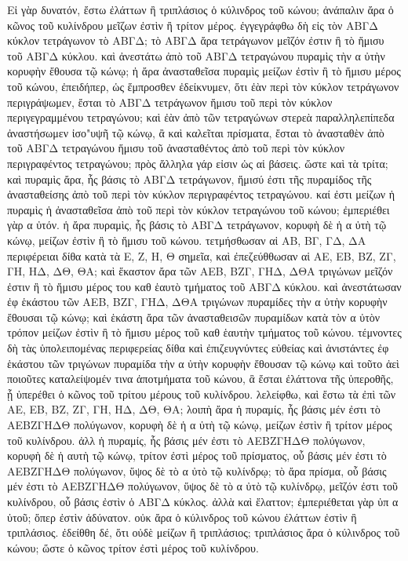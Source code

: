 \begin{Parallel}{}{}
{{\greekfont Εἰ γὰρ δυνατόν, ἔστω ἐλάττων ἢ τριπλάσιος ὁ κύλινδρος τοῦ κώνου;
  ἀνάπαλιν ἄρα ὁ κῶνος
τοῦ κυλίνδρου μεῖζων ἐστὶν ἢ τρίτον μέρος. ἐγγεγράφθω δὴ εἰς τὸν ΑΒΓΔ κύκλον τετράγωνον τὸ
ΑΒΓΔ; τὸ ΑΒΓΔ ἄρα τετράγωνον μεῖζόν ἐστιν ἢ τὸ ἥμισυ τοῦ ΑΒΓΔ κύκλου. καὶ ἀνεστάτω
ἀπὸ τοῦ ΑΒΓΔ τετραγώνου πυραμὶς τὴν α ὐτὴν κορυφὴν ἔθουσα τῷ κώνῳ; ἠ ἄρα ἀνασταθεῖσα
πυραμὶς μείζων ἐστὶν ἢ τὸ ἥμισυ μέρος τοῦ κώνου, ἐπειδήπερ, ὡς ἕμπροσθεν ἐδείκνυμεν,
ὅτι ἐὰν περὶ τὸν κύκλον τετράγωνον περιγράψωμεν, ἔσται τὸ ΑΒΓΔ τετράγωνον ἥμισυ τοῦ
περὶ τὸν κύκλον περιγεγραμμένου τετραγώνου; καὶ ἐὰν ἀπὸ τῶν τετραγώνων στερεὰ παραλληλεπίπεδα
ἀναστήσωμεν ἰσο"υψῆ τῷ κώνῳ, ἂ καὶ καλεῖται πρίσματα, ἔσται τὸ ἀνασταθὲν ἀπὸ τοῦ
ΑΒΓΔ τετραγώνου ἥμισυ τοῦ ἀνασταθέντος ἀπὸ τοῦ περὶ τὸν κύκλον περιγραφέντος τετραγώνου;
πρὸς ἄλληλα γάρ εἰσιν ὡς αἱ βάσεις. ὥστε καὶ τὰ τρίτα; καὶ πυραμὶς ἄρα, ἧς βάσις
τὸ ΑΒΓΔ τετράγωνον, ἥμισύ ἐστι τῆς πυραμίδος τῆς ἀνασταθείσης ἀπὸ τοῦ περὶ τὸν
κύκλον περιγραφέντος τετραγώνου.
καί ἐστι μείζων ἡ πυραμὶς ἡ ἀνασταθεῖσα ἀπὸ τοῦ περὶ τὸν κύκλον τετραγώνου τοῦ κώνου;
ἐμπεριέθει γὰρ α ὐτόν. ἡ ἄρα πυραμὶς, ἧς βάσις τὸ ΑΒΓΔ τετράγωνον, κορυφὴ δὲ ἡ α ὐτὴ
τῷ κώνῳ, μείζων ἐστὶν ἢ τὸ ἥμισυ τοῦ κώνου. τετμήσθωσαν αἱ ΑΒ, ΒΓ, ΓΔ, ΔΑ περιφέρειαι
δίθα κατὰ τὰ Ε, Ζ, Η, Θ σημεῖα, καὶ ἐπεζεύθθωσαν αἱ ΑΕ, ΕΒ, ΒΖ, ΖΓ, ΓΗ, ΗΔ, ΔΘ, ΘΑ; καὶ ἕκαστον
ἄρα τῶν ΑΕΒ, ΒΖΓ, ΓΗΔ, ΔΘΑ τριγώνων μεῖζόν ἐστιν ἢ τὸ ἥμισυ μέρος του καθ
ἑαυτὸ τμήματος  τοῦ ΑΒΓΔ κύκλου.
καὶ ἀνεστάτωσαν
ἐφ ἑκάστου τῶν ΑΕΒ, ΒΖΓ, ΓΗΔ, ΔΘΑ τριγώνων πυραμίδες τὴν α ὐτὴν κορυφὴν ἔθουσαι τῷ
κώνῳ; καὶ ἑκάστη ἄρα τῶν ἀνασταθεισῶν πυραμίδων κατὰ τὸν α ὐτὸν τρόπον
μείζων ἐστὶν ἢ τὸ ἥμισυ μέρος τοῦ καθ ἑαυτὴν τμήματος τοῦ κώνου. τέμνοντες δὴ τὰς
ὑπολειπομένας περιφερείας δίθα καὶ ἐπιζευγνύντες εὐθείας καὶ ἀνιστάντες ἐφ ἑκάστου τῶν
τριγώνων πυραμίδα τὴν α ὐτὴν κορυφὴν ἔθουσαν τῷ κώνῳ καὶ τοῦτο ἀεὶ ποιοῦτες
καταλείψομέν τινα ἀποτμήματα τοῦ κώνου, ἃ ἔσται ἐλάττονα τῆς ὑπεροθῆς, ᾗ ὑπερέθει
ὁ κῶνος τοῦ τρίτου μέρους τοῦ κυλίνδρου. λελείφθω, καὶ ἔστω τὰ ἐπὶ τῶν ΑΕ, ΕΒ, ΒΖ, ΖΓ, ΓΗ,
ΗΔ, ΔΘ, ΘΑ; λοιπὴ  ἄρα ἡ πυραμίς, ἧς βάσις μέν ἐστι τὸ ΑΕΒΖΓΗΔΘ
πολύγωνον, κορυφὴ δὲ ἡ α ὐτὴ τῷ κώνῳ, μείζων ἐστὶν ἢ τρίτον μέρος τοῦ κυλίνδρου. ἀλλ ἡ
πυραμίς, ἧς βάσις μέν ἐστι τὸ ΑΕΒΖΓΗΔΘ πολύγωνον, κορυφὴ δὲ ἡ 
αυτὴ τῷ κώνῳ, τρίτον
ἐστὶ μέρος τοῦ πρίσματος, οὗ βάσις μέν ἐστι τὸ ΑΕΒΖΓΗΔΘ πολύγωνον, ὕψος
δὲ τὸ α ὐτὸ τῷ κυλίνδρῳ; τὸ ἄρα πρίσμα, οὗ βάσις μέν ἐστι τὸ ΑΕΒΖΓΗΔΘ πολύγωνον, ὕψος
δὲ τὸ α ὐτὸ τῷ κυλίνδρῳ, μεῖζόν ἐστι τοῦ κυλίνδρου, οὗ βάσις ἐστὶν ὁ ΑΒΓΔ κύκλος. ἀλλὰ
καὶ ἔλαττον; ἐμπεριέθεται γὰρ ὑπ α ὐτοῦ;  ὅπερ ἐστὶν ἀδύνατον. οὐκ ἄρα ὁ κύλινδρος
τοῦ κώνου ἐλάττων ἐστὶν ἢ τριπλάσιος. ἐδείθθη δέ, ὅτι οὐδὲ μείζων ἢ τριπλάσιος; τριπλάσιος
ἄρα ὁ κύλινδρος τοῦ κώνου; ὥστε ὁ κῶνος τρίτον ἐστὶ μέρος τοῦ κυλίνδρου.}

}
\end{Parallel}
